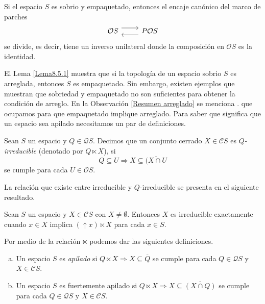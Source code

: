 \begin{lem}\label{Lema8.5.2}
    Si el espacio $S$ es sobrio y empaquetado, entonces el encaje canónico del marco de parches
    \[\begin{tikzcd}
	{\mathcal{O}S} & {P\mathcal{O}S}
	\arrow[shift left=2, from=1-1, to=1-2]
	\arrow[shift left=2, from=1-2, to=1-1]
\end{tikzcd}\]
se divide, es decir, tiene un inverso unilateral donde la composición en $\mathcal{O}S$ es la identidad.
\end{lem}

El Lema \ref{Lema8.5.1} muestra que si la topología de un espacio sobrio $S$ es arreglada, entonces $S$ es empaquetado. Sin embargo, existen ejemplos que muestran que sobriedad y empaquetado no son suficientes para obtener la condición de arreglo. En la Observación \ref{Resumen arreglado} se menciona .
que ocupamos para que empaquetado implique arreglado. Para saber que significa que un espacio sea apilado necesitamos un par de definiciones.

\begin{dfn}\label{Definicion8.5.3}
    Sean $S$ un espacio y $Q\in \mathcal{Q}S$. Decimos que un conjunto cerrado $X\in \mathcal{C}S$ es \emph{$Q$-irreducible} (denotado por $Q\ltimes X$), si 
    \[
    Q\subseteq U\Rightarrow X\subseteq \overline{(X\cap U}
    \]
    se cumple para cada $U\in \mathcal{O}S$.
\end{dfn}

La relación que existe entre irreducible y $Q$-irreducible se presenta en el siguiente resultado.
\begin{lem}\label{Lema8.5.4}
    Sean $S$ un espacio y $X\in \mathcal{C}S$ con $X\neq \emptyset$. Entonces $X$ es irreducible exactamente cuando $x\in X$  implica $(\uparrow x)\ltimes X$ para cada $x\in S$.
\end{lem}

Por medio de la relación $\ltimes$ podemos dar las siguientes definiciones.

\begin{dfn}\label{Definicion8.5.5}
    \begin{enumerate}[a)]
        \item Un espacio $S$ es \emph{apilado} si $Q\ltimes X \Rightarrow X\subseteq \overline{Q}$ se cumple para cada $Q\in \mathcal{Q}S$ y $X\in \mathcal{C}S$.
        
        \item Un espacio $S$ es fuertemente apilado si $Q\ltimes X \Rightarrow X\subseteq \overline{(X\cap Q)}$ se cumple para cada $Q\in \mathcal{Q}S$ y $X\in \mathcal{C}S$. 
    \end{enumerate}
\end{dfn}

